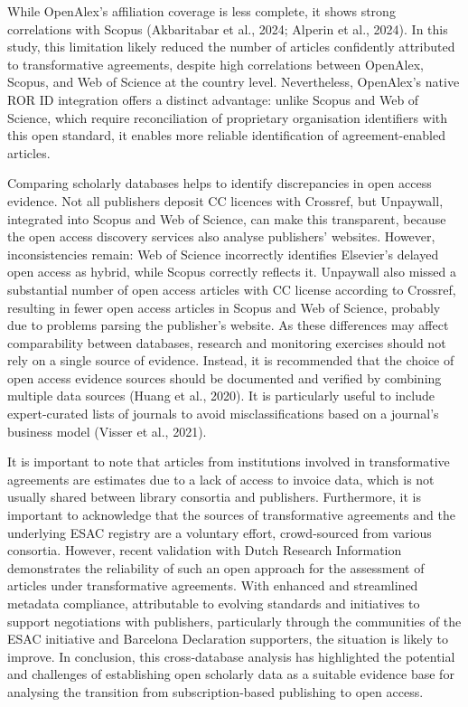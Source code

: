 \documentclass[a4paper,man,floatsintext,longtable,noextraspace,10pt]{apa6}
\begin{document}
While OpenAlex's affiliation coverage is less complete, it shows strong
correlations with Scopus (Akbaritabar et al., 2024; Alperin et al.,
2024). In this study, this limitation likely reduced the number of
articles confidently attributed to transformative agreements, despite
high correlations between OpenAlex, Scopus, and Web of Science at the
country level. Nevertheless, OpenAlex's native ROR ID integration offers
a distinct advantage: unlike Scopus and Web of Science, which require
reconciliation of proprietary organisation identifiers with this open
standard, it enables more reliable identification of agreement-enabled
articles.

Comparing scholarly databases helps to identify discrepancies in open
access evidence. Not all publishers deposit CC licences with Crossref,
but Unpaywall, integrated into Scopus and Web of Science, can make this
transparent, because the open access discovery services also analyse
publishers' websites. However, inconsistencies remain: Web of Science
incorrectly identifies Elsevier's delayed open access as hybrid, while
Scopus correctly reflects it. Unpaywall also missed a substantial number
of open access articles with CC license according to Crossref, resulting
in fewer open access articles in Scopus and Web of Science, probably due
to problems parsing the publisher's website. As these differences may
affect comparability between databases, research and monitoring
exercises should not rely on a single source of evidence. Instead, it is
recommended that the choice of open access evidence sources should be
documented and verified by combining multiple data sources (Huang et
al., 2020). It is particularly useful to include expert-curated lists of
journals to avoid misclassifications based on a journal's business model
(Visser et al., 2021).

It is important to note that articles from institutions involved in
transformative agreements are estimates due to a lack of access to
invoice data, which is not usually shared between library consortia and
publishers. Furthermore, it is important to acknowledge that the sources
of transformative agreements and the underlying ESAC registry are a
voluntary effort, crowd-sourced from various consortia. However, recent
validation with Dutch Research Information demonstrates the reliability
of such an open approach for the assessment of articles under
transformative agreements. With enhanced and streamlined metadata
compliance, attributable to evolving standards and initiatives to
support negotiations with publishers, particularly through the
communities of the ESAC initiative and Barcelona Declaration supporters,
the situation is likely to improve. In conclusion, this cross-database
analysis has highlighted the potential and challenges of establishing
open scholarly data as a suitable evidence base for analysing the
transition from subscription-based publishing to open access.
\end{document}
